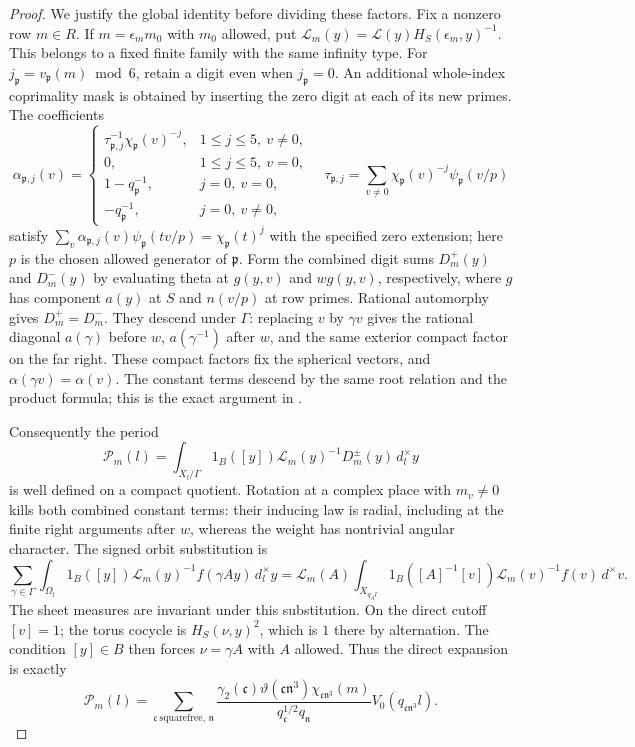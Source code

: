 \documentclass[11pt,a4paper]{article}
\numberwithin{equation}{section}
\theoremstyle{definition}
\theoremstyle{remark}
\begin{document}
\begin{proof}
We justify the global identity before dividing these factors.
Fix a nonzero row $m\in R$.  If
$m=\epsilon_m m_0$ with $m_0$ allowed, put
$\mathcal L_m(y)=\mathcal L(y)H_S(\epsilon_m,y)^{-1}$.
This belongs to a fixed finite family with the same infinity type.
For $j_{\mathfrak p}=v_{\mathfrak p}(m)\bmod6$, retain a digit even when
$j_{\mathfrak p}=0$.  An additional whole-index coprimality mask is
obtained by inserting the zero digit at each of its new primes.
The coefficients
\[
 \alpha_{\mathfrak p,j}(v)=
 \begin{cases}
 \tau_{\mathfrak p,j}^{-1}\chi_{\mathfrak p}(v)^{-j},
       &1\le j\le5,\ v\ne0,\\
 0,&1\le j\le5,\ v=0,\\
 1-q_{\mathfrak p}^{-1},&j=0,\ v=0,\\
 -q_{\mathfrak p}^{-1},&j=0,\ v\ne0,
 \end{cases}
 \quad
 \tau_{\mathfrak p,j}=\sum_{v\ne0}
        \chi_{\mathfrak p}(v)^{-j}\psi_{\mathfrak p}(v/p)
\]
satisfy $\sum_v\alpha_{\mathfrak p,j}(v)
\psi_{\mathfrak p}(tv/p)=\chi_{\mathfrak p}(t)^j$ with the
specified zero extension; here $p$ is the chosen allowed generator of
$\mathfrak p$.  Form the combined digit sums $D_m^+(y)$ and
$D_m^-(y)$ by evaluating theta at $g(y,v)$ and $wg(y,v)$, respectively,
where $g$ has component $a(y)$ at $S$ and $n(v/p)$ at row
primes.  Rational automorphy gives $D_m^+=D_m^-$.
They descend under $\Gamma$: replacing $v$ by $\gamma v$ gives the
rational diagonal $a(\gamma)$ before $w$, $a(\gamma^{-1})$ after $w$,
and the same exterior compact factor on the far right.  These compact
factors fix the spherical vectors, and $\alpha(\gamma v)=\alpha(v)$.
The constant terms descend by the same root relation and the product
formula; this is the exact argument in \cite[(6.6)--(6.7)]{P}.

Consequently the period
\[
 \mathcal P_m(l)=\int_{X_l/\Gamma}
       1_B([y])\mathcal L_m(y)^{-1}D_m^\pm(y)\,d_l^\times y
\]
is well defined on a compact quotient.  Rotation at a complex place with
$m_v\ne0$ kills both combined constant terms: their inducing law is
radial, including at the finite right arguments after $w$, whereas the
weight has nontrivial angular character.
The signed orbit substitution is
\begin{equation}\label{eq:theta-orbit-unfolding}
 \sum_{\gamma\in\Gamma}\int_{\Omega_l}
 1_B([y])\mathcal L_m(y)^{-1}f(\gamma Ay)\,d_l^\times y
 =\mathcal L_m(A)\int_{X_{q_A l}}
 1_B([A]^{-1}[v])\mathcal L_m(v)^{-1}f(v)\,d^\times v.
\end{equation}
The sheet measures are invariant under this substitution.  On the direct cutoff $[v]=1$;
the torus cocycle is $H_S(\nu,y)^2$, which is $1$ there by alternation.
The condition $[y]\in B$ then forces $\nu=\gamma A$ with $A$ allowed.
Thus the direct expansion is exactly
\begin{equation}\label{eq:theta-direct-period}
 \mathcal P_m(l)=
 \sum_{\mathfrak c\ {\mathrm{squarefree}},\,\mathfrak n}
 \frac{\gamma_2(\mathfrak c)\vartheta(\mathfrak c\mathfrak n^3)
              \chi_{\mathfrak c\mathfrak n^3}(m)}
      {q_{\mathfrak c}^{1/2}q_{\mathfrak n}}
       V_0(q_{\mathfrak c\mathfrak n^3}l).
\end{equation}


\end{proof}
\end{document}

